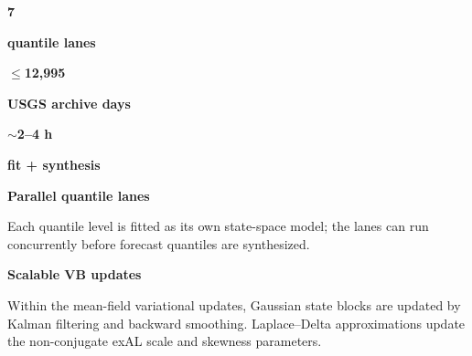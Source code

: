 \documentclass[final]{beamer}
\newif\ifPosterHasRaleway
\newlength{\PosterLeftColumnWidth}
\newcommand{\DisplayFont}{\ifPosterHasRaleway\fontfamily{Raleway-TLF}\selectfont\else\sffamily\fi}
\newcommand{\SmallBodyFont}{\fontsize{24}{30}\selectfont}
\newcommand{\CaptionFont}{\fontsize{23.5}{29}\selectfont}
\newcommand{\FootFont}{\fontsize{18.5}{23}\selectfont}
\begin{document}
\begin{frame}[t]
{\begin{minipage}[t]{\PosterLeftColumnWidth}
\begin{minipage}[t]{\linewidth}
\vspace{0.20cm}
\begin{SoftNote}[colback=PanelLavender,colframe=PanelLavender,borderline west={1.0mm}{0pt}{StructureColor},top=0.48cm,bottom=0.46cm]
  \begin{minipage}[c]{0.29\linewidth}
    \centering
    {\DisplayFont\bfseries\fontsize{43}{43}\selectfont\color{TitleSlate}7\par}
    \vspace{0.05cm}
    {\FootFont\bfseries\color{TitleSlate}quantile lanes\par}
  \end{minipage}\hfill
  \begin{minipage}[c]{0.34\linewidth}
    \centering
    {\DisplayFont\bfseries\fontsize{38}{40}\selectfont\color{TitleSlate}\(\leq\)12,995\par}
    \vspace{0.05cm}
    {\FootFont\bfseries\color{TitleSlate}USGS archive days\par}
  \end{minipage}\hfill
  \begin{minipage}[c]{0.29\linewidth}
    \centering
    {\DisplayFont\bfseries\fontsize{38}{40}\selectfont\color{TitleSlate}\(\sim\)2--4 h\par}
    \vspace{0.05cm}
    {\FootFont\bfseries\color{TitleSlate}fit + synthesis\par}
  \end{minipage}
\end{SoftNote}

\vspace{0.24cm}
\begin{SoftNote}
  \RaggedRight
  {\SmallBodyFont\bfseries\color{TitleSlate}Parallel quantile lanes\par}
  \vspace{0.04cm}
  {\CaptionFont\color{MutedSlate}
  Each quantile level is fitted as its own state-space model; the lanes can run
  concurrently before forecast quantiles are synthesized.\par}

  \vspace{0.22cm}
  {\SmallBodyFont\bfseries\color{TitleSlate}Scalable VB updates\par}
  \vspace{0.04cm}
  {\CaptionFont\color{MutedSlate}
  Within the mean-field variational updates, Gaussian state blocks are updated
  by Kalman filtering and backward smoothing. Laplace--Delta approximations
  update the non-conjugate exAL scale and skewness parameters.\par}
\end{SoftNote}


\end{minipage}
\end{minipage}}
\end{frame}
\end{document}
